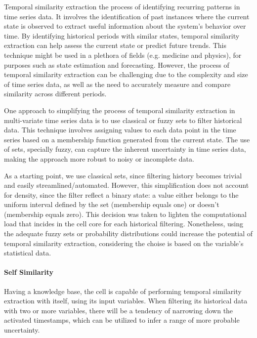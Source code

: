 Temporal similarity extraction the process of identifying recurring patterns in time series data. It involves the identification of past instances where the current state is observed to extract useful information about the system's behavior over time. By identifying historical periods with similar states, temporal similarity extraction can help assess the current state or predict future trends. This technique might be used in a plethora of fields (e.g. medicine and physics), for purposes such as state estimation and forecasting. However, the process of temporal similarity extraction can be challenging due to the complexity and size of time series data, as well as the need to accurately measure and compare similarity across different periods.

One approach to simplifying the process of temporal similarity extraction in multi-variate time series data is to use classical or fuzzy sets to filter historical data. This technique involves assigning values to each data point in the time series based on a membership function generated from the current state. The use of sets, specially fuzzy, can capture the inherent uncertainty in time series data, making the approach more robust to noisy or incomplete data.

As a starting point, we use classical sets, since filtering history becomes trivial and easily streamlined/automated. However, this simplification does not account for density, since the filter reflect a binary state: a value either belongs to the uniform interval defined by the set (membership equals one) or doesn't (membership equals zero). This decision was taken to lighten the computational load that incides in the cell core for each historical filtering. Nonetheless, using the adequate fuzzy sets or probability distributions could increase the potential of temporal similarity extraction, considering the choise is based on the variable's statistical data.





\paragraph{Self Similarity}

Having a knowledge base, the cell is capable of performing temporal similarity extraction with itself, using its input variables. When filtering its historical data with two or more variables, there will be a tendency of narrowing down the activated timestamps, which can be utilized to infer a range of more probable uncertainty.

